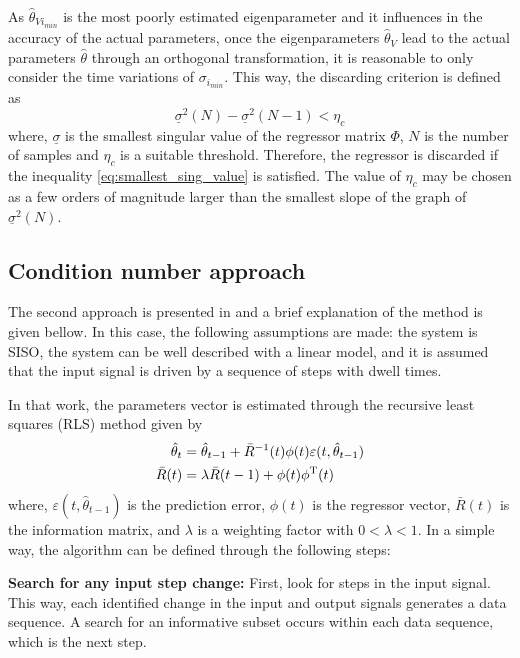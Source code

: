 As $\hat{\theta}_{Vi_{min}}$ is the most poorly estimated eigenparameter and it influences in the accuracy of the actual parameters, once the eigenparameters $\hat{\theta}_V$ lead to the actual parameters $\hat{\theta}$ through an orthogonal transformation, it is reasonable to only consider the time variations of $\sigma_{i_{min}}$.
This way, the discarding criterion is defined as
\begin{equation}
	\underline{\sigma}^2(N) - \underline{\sigma}^2(N-1) < \eta_c
\label{eq:smallest_sing_value}
\end{equation}
where, $\underline{\sigma}$ is the smallest singular value of the regressor matrix $\Phi$, $N$ is the number of samples and $\eta_c$ is a suitable threshold.
Therefore, the regressor is discarded if the inequality \eqref{eq:smallest_sing_value} is satisfied.
The value of $\eta_c$ may be chosen as a few orders of magnitude larger than the smallest slope of the graph of $\underline{\sigma}^2(N)$.




\subsection{Condition number approach}
The second approach is presented in \cite{bittencourt2015algorithm} and a brief explanation of the method is given bellow.
In this case, the following assumptions are made: the system is SISO, the system can be well described with a linear model, and it is assumed that the input signal is driven by a sequence of steps with dwell times.


In that work, the parameters vector is estimated through the recursive least squares (RLS) method given by
\begin{align*}
	\hat{\theta}_t &= \hat{\theta}_{t-1} + \bar{R}^{-1}(t)\phi(t)\varepsilon(t, \hat{\theta}_{t-1}) \\
	\bar{R}(t) &= \lambda\bar{R}(t-1) + \phi(t)\phi\tran(t) %
\end{align*}
where, $\varepsilon(t, \hat{\theta}_{t-1})$ is the prediction error, $\phi(t)$ is the regressor vector, $\bar{R}(t)$ is the information matrix, and $\lambda$ is a weighting factor with $0<\lambda<1$.
In a simple way, the algorithm can be defined through the following steps:

\textbf{Search for any input step change:} First, look for steps in the input signal.
This way, each identified change in the input and output signals generates a data sequence.
A search for an informative subset occurs within each data sequence, which is the next step.

